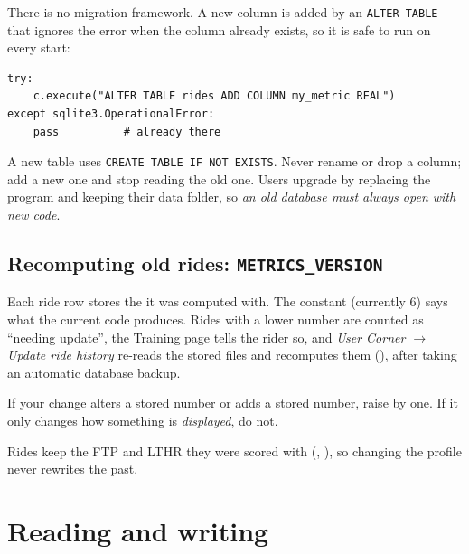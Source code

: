 There is no migration framework. A new column is added by an \texttt{ALTER TABLE} that ignores the error when the
column already exists, so it is safe to run on every start:

\begin{lstlisting}
try:
    c.execute("ALTER TABLE rides ADD COLUMN my_metric REAL")
except sqlite3.OperationalError:
    pass          # already there
\end{lstlisting}

A new table uses \texttt{CREATE TABLE IF NOT EXISTS}. Never rename or drop a column; add a new one and stop reading
the old one. Users upgrade by replacing the program and keeping their data folder, so \emph{an old database must always
open with new code}.

\subsection{Recomputing old rides: \texttt{METRICS\_VERSION}}

Each ride row stores the  it was computed with. The constant 
(currently 6) says what the current code produces. Rides with a lower number are counted as ``needing update'',
the Training page tells the rider so, and \emph{User Corner $\rightarrow$ Update ride history} re-reads the stored
files and recomputes them (), after taking an automatic database backup.

\begin{tip}
If your change alters a stored number or adds a stored number, raise  by one. If it only
changes how something is \emph{displayed}, do not.
\end{tip}

Rides keep the FTP and LTHR they were scored with (, ), so changing the
profile never rewrites the past.

\section{Reading and writing}

